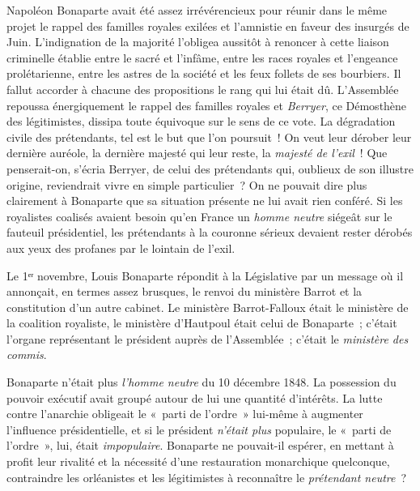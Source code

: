 \documentclass[french,twoside]{book} %
\begin{document}
Napoléon Bonaparte avait été assez irrévérencieux pour réunir dans le même projet le rappel des familles royales exilées et l’amnistie en faveur des insurgés de Juin. L’indignation de la majorité l’obligea aussitôt à renoncer à cette liaison criminelle établie entre le sacré et l’infâme, entre les races royales et l’engeance prolétarienne, entre les astres de la société et les feux follets de ses bourbiers. Il fallut accorder à chacune des propositions le rang qui lui était dû. L’Assemblée repoussa énergiquement le rappel des familles royales et \emph{Berryer}, ce Démosthène des légitimistes, dissipa toute équivoque sur le sens de ce vote. La dégradation civile des prétendants, tel est le but que l’on poursuit ! On veut leur dérober leur dernière auréole, la dernière majesté qui leur reste, la \emph{majesté de l’exil} ! Que penserait-on, s’écria Berryer, de celui des prétendants qui, oublieux de son illustre origine, reviendrait vivre en simple particulier ? On ne pouvait dire plus clairement à Bonaparte que sa situation présente ne lui avait rien conféré. Si les royalistes coalisés avaient besoin qu’en France un \emph{homme neutre} siégeât sur le fauteuil présidentiel, les prétendants à la couronne sérieux devaient rester dérobés aux yeux des profanes par le lointain de l’exil.\par
Le 1ᵉʳ novembre, Louis Bonaparte répondit à la Législative par un message où il annonçait, en termes assez brusques, le renvoi du ministère Barrot et la constitution d’un autre cabinet. Le ministère Barrot-Falloux était le ministère de la coalition royaliste, le ministère d’Hautpoul était celui de Bonaparte ; c’était l’organe représentant le président auprès de l’Assemblée ; c’était le \emph{ministère des commis}.\par
Bonaparte n’était plus \emph{l’homme neutre} du 10 décembre 1848. La possession du pouvoir exécutif avait groupé autour de lui une quantité d’intérêts. La lutte contre l’anarchie obligeait le « parti de l’ordre » lui-même à augmenter l’influence présidentielle, et si le président \emph{n’était plus} populaire, le « parti de l’ordre », lui, était \emph{impopulaire}. Bonaparte ne pouvait-il espérer, en mettant à profit leur rivalité et la nécessité d’une restauration monarchique quelconque, contraindre les orléanistes et les légitimistes à reconnaître le \emph{prétendant neutre} ?\par
\end{document}
